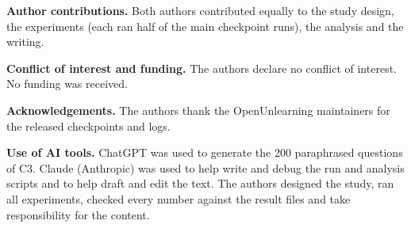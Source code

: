 \documentclass[conference]{IEEEtran}
\begin{document}
\textbf{Author contributions.} Both authors contributed equally to the study design, the experiments (each ran half of the main checkpoint runs), the analysis and the writing.

\textbf{Conflict of interest and funding.} The authors declare no conflict of interest. No funding was received.

\textbf{Acknowledgements.} The authors thank the OpenUnlearning maintainers for the released checkpoints and logs.

\textbf{Use of AI tools.} ChatGPT was used to generate the 200 paraphrased questions of C3. Claude (Anthropic) was used to help write and debug the run and analysis scripts and to help draft and edit the text. The authors designed the study, ran all experiments, checked every number against the result files and take responsibility for the content.
\end{document}
